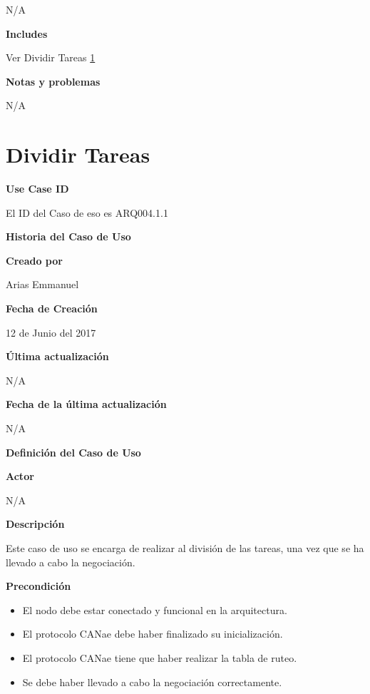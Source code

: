 N/A

\large\textbf{Includes}
\vspace{3mm}

Ver Dividir Tareas \ref{uc:DividirTareas}

\large\textbf{Notas y problemas}
\vspace{3mm}

N/A



\section{Dividir Tareas}\label{uc:DividirTareas}

\large\textbf{Use Case ID}
\vspace{3mm}

El ID del Caso de eso es ARQ004.1.1

\Large\textbf{Historia del Caso de Uso}
\vspace{3mm}

\large\textbf{Creado por}
\vspace{3mm}

Arias Emmanuel

\large\textbf{Fecha de Creación}
\vspace{3mm}

12 de Junio del 2017

\large\textbf{Última actualización}
\vspace{3mm}

N/A

\large\textbf{Fecha de la última actualización}
\vspace{3mm}

N/A

\Large\textbf{Definición del Caso de Uso}
\vspace{3mm}

\large\textbf{Actor}
\vspace{3mm}

N/A

\large\textbf{Descripción}
\vspace{3mm}

Este caso de uso se encarga de realizar al división de las tareas,
una vez que se ha llevado a cabo la negociación.

\large\textbf{Precondición}
\begin{itemize}
\item El nodo debe estar conectado y funcional en la arquitectura.
\item El protocolo CANae debe haber finalizado su inicialización.
\item El protocolo CANae tiene que haber realizar la tabla de ruteo.
\item Se debe haber llevado a cabo la negociación correctamente.
\end{itemize}


